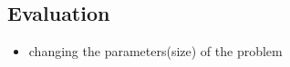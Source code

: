 \subsection{Evaluation }
\begin{itemize}
\item changing the parameters(size) of the problem
\end{itemize}







